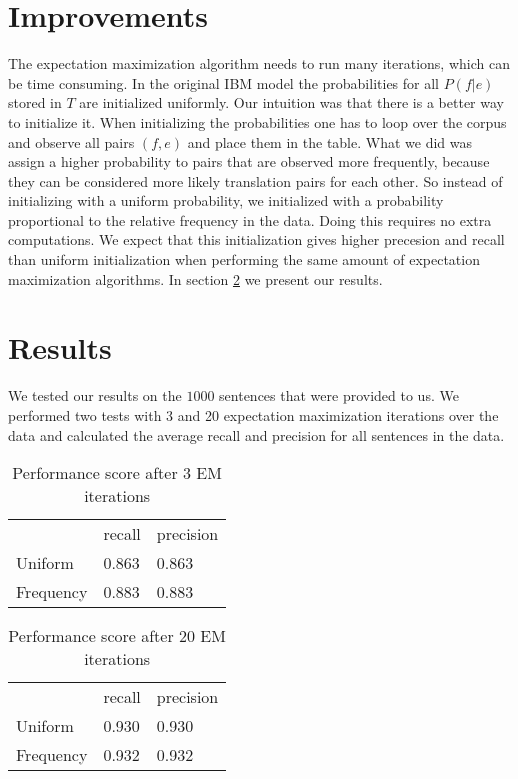 \documentclass[11pt]{article}
\begin{document}
\section{Improvements}
\label{own}
The expectation maximization algorithm needs to run many iterations, which can be time consuming. In the original IBM model the probabilities for all $P(f|e)$ stored in $T$ are initialized uniformly. Our intuition was that there is a better way to initialize it. When initializing the probabilities one has to loop over the corpus and observe all pairs $(f,e)$ and place them in the table. What we did was assign a higher probability to pairs that are observed more frequently, because they can be considered more likely translation pairs for each other. So instead of initializing with a uniform probability, we initialized with a probability proportional to the relative frequency in the data. Doing this requires no extra computations. We expect that this initialization gives higher precesion and recall than uniform initialization when performing the same amount of expectation maximization algorithms. In section \ref{results} we present our results.

\section{Results}
\label{results}
We tested our results on the $1000$ sentences that were provided to us. We performed two tests with 3 and 20 expectation maximization iterations over the data and calculated the average recall and precision for all sentences in the data. 

\begin{table}[H]
    \begin{tabular}{lll}
    ~ & recall  & precision \\
    Uniform & 0.863 & 0.863 \\
    Frequency & 0.883 & 0.883 \\
    \end{tabular}
    \caption{Performance score after 3 EM iterations}
\end{table}

\begin{table}[H]
    \begin{tabular}{lll}
    ~ & recall  & precision \\
    Uniform & 0.930 & 0.930 \\
    Frequency & 0.932 & 0.932 \\
    \end{tabular}
    \caption{Performance score after 20 EM iterations}
\end{table}
\end{document}
